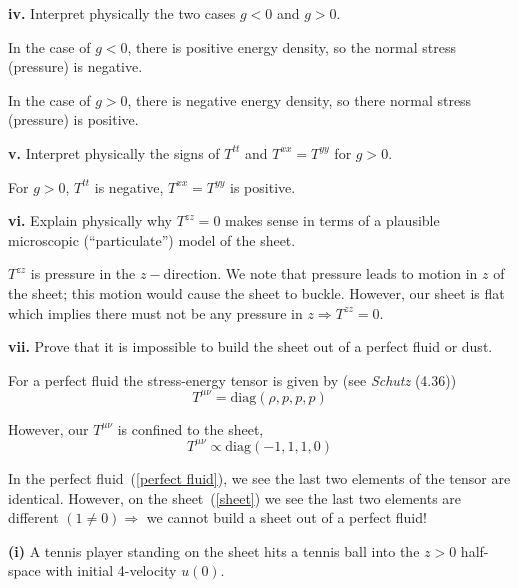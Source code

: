\documentclass[a4paper]{article} %
\begin{document}
\begin{framed}
\textbf{iv.} Interpret physically the two cases $g < 0$ and $g > 0$.
\end{framed}

In the case of $g<0$, there is positive energy density, so the normal stress (pressure) is negative.

In the case of $g>0$, there is negative energy density, so there normal stress (pressure) is positive.


\begin{framed}
\textbf{v.} Interpret physically the signs of $T^{tt}$ and $T^{xx} = T^{yy}$ for $g > 0$.
\end{framed}

For $g>0$, $T^{tt}$ is negative, $T^{xx}=T^{yy}$ is positive.

\begin{framed}
\textbf{vi.}  Explain physically why $T^{zz} = 0$ makes sense in terms of a plausible microscopic
(``particulate'') model of the sheet.
\end{framed}

$T^{zz}$ is pressure in the $z-$direction. We note that pressure leads to motion in $z$ of the sheet; this motion would cause the sheet to buckle. However, our sheet is flat which implies there must not be any pressure in $z \Rightarrow T^{zz}=0$.

\begin{framed}
\textbf{vii.} Prove that it is impossible to build the sheet out of a perfect fluid or dust.
\end{framed}

For a perfect fluid the stress-energy tensor is given by (see \emph{Schutz} (4.36))
\begin{equation}
T^{\mu\nu}=\text{diag}(\rho,p,p,p)\label{perfect fluid}
\end{equation}

However, our $T^{\mu\nu}$ is confined to the sheet,
\begin{equation}
T^{\mu\nu}\propto \text{diag}(-1,1,1,0)\label{sheet}
\end{equation}

In the perfect fluid~(\ref{perfect fluid}), we see the last two elements of the tensor are identical. However, on the sheet~(\ref{sheet}) we see the last two elements are different $(1\neq 0) \Rightarrow $ we cannot build a sheet out of a perfect fluid!

\begin{framed}
\textbf{(i)} A tennis player standing on the sheet hits a tennis ball into the $z>0$ half-space with initial 4-velocity $u(0)$.
\end{framed}
\end{document}
